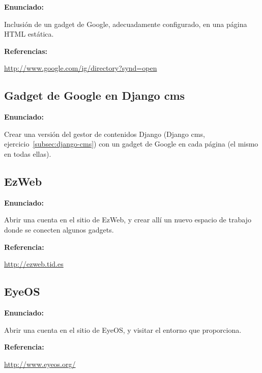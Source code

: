 \textbf{Enunciado:}

Inclusión de un gadget de Google, adecuadamente configurado, en una página HTML estática.

\textbf{Referencias:}

\url{http://www.google.com/ig/directory?synd=open}

\subsection{Gadget de Google en Django cms}
\label{subsec:gadget-google-cms}

\textbf{Enunciado:}

Crear una versión del gestor de contenidos Django (Django cms, ejercicio~\ref{subsec:django-cms}) con un gadget de Google en cada página (el mismo en todas ellas).

\subsection{EzWeb}
\label{subsec:ezweb}

\textbf{Enunciado:}

Abrir una cuenta en el sitio de EzWeb, y crear allí un nuevo espacio de trabajo donde se conecten algunos gadgets.

\textbf{Referencia:}

\url{http://ezweb.tid.es}

\subsection{EyeOS}
\label{subsec:eyeos}

\textbf{Enunciado:}

Abrir una cuenta en el sitio de EyeOS, y visitar el entorno que proporciona.

\textbf{Referencia:}

\url{http://www.eyeos.org/}

